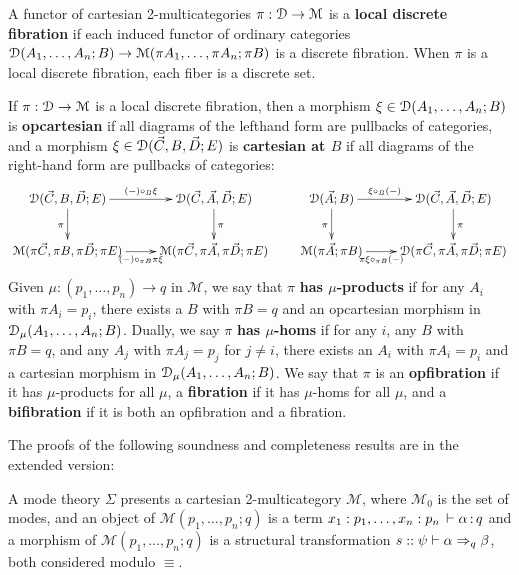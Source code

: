 \documentclass[a4paper,USenglish,numberwithinsect]{lipics-v2016}
\newcommand\deq{\ensuremath{\equiv}}
\renewcommand{\oftp}[3]{\ensuremath{#1 \, \vdash #2 \, \dcd{:} \, #3}}
\def\M{\mathcal{M}}
\begin{document}
\begin{definition}
  A functor of cartesian 2-multicategories $\pi:\cD\to\M$ is a
  \textbf{local discrete fibration} if each induced functor of ordinary
  categories $\cD(A_1,\dots,A_n;B)\to\M(\pi A_1,\dots,\pi A_n;\pi B)$ is
  a discrete fibration.  When $\pi$ is a local discrete fibration, each
  fiber is a discrete set.
\end{definition}

\begin{definition}
  If $\pi:\cD\to\M$ is a local discrete fibration, then a morphism
  $\xi\in\mathcal{D}(A_1,\dots,A_n;B)$ is \textbf{opcartesian} if all diagrams
  of the lefthand form are pullbacks of categories, and a morphism
  $\xi\in\mathcal{D}(\vec C,B,\vec D;E)$ is \textbf{cartesian at $B$} if all
  diagrams of the right-hand form are pullbacks of categories: 
  \[ \xymatrix{
    \cD(\vec C,B,\vec D;E) \ar[r]^-{(-)\circ_B \xi} \ar[d]_\pi &
    \cD(\vec C,\vec A,\vec D;E) \ar[d]^\pi \\
    \M(\pi\vec C,\pi B, \pi\vec D; \pi E) \ar[r]_-{(-)\circ_{\pi B} \pi\xi} &
    \M(\pi\vec C,\pi\vec A,\pi\vec D;\pi E)
  }
  \qquad
  \xymatrix{
    \cD(\vec A;B) \ar[r]^-{\xi\circ_B (-)} \ar[d]_\pi &
    \cD(\vec C,\vec A,\vec D;E) \ar[d]^\pi \\
    \M(\pi\vec A;\pi B) \ar[r]_-{\pi\xi\circ_{\pi B} (-)} &
    \cD(\pi\vec C,\pi\vec A,\pi\vec D;\pi E)}
  \]
  Given $\mu:(p_1,\dots,p_n) \to q$ in $\M$, we say that $\pi$ \textbf{has $\mu$-products} if for any $A_i$ with $\pi A_i = p_i$, there exists a $B$ with $\pi B = q$ and an opcartesian morphism in $\mathcal{D}_\mu(A_1,\dots,A_n;B)$.
  Dually, we say $\pi$ \textbf{has $\mu$-homs} if for any $i$, any $B$ with $\pi B = q$, and any $A_j$ with $\pi A_j = p_j$ for $j\neq i$, there exists an $A_i$ with $\pi A_i = p_i$ and a cartesian morphism in $\mathcal{D}_\mu(A_1,\dots,A_n;B)$.
  We say that $\pi$ is an \textbf{opfibration} if it has $\mu$-products for all $\mu$, a \textbf{fibration} if it has $\mu$-homs for all $\mu$, and a \textbf{bifibration} if it is both an opfibration and a fibration.
\end{definition}

The proofs of the following soundness and completeness results are in
the extended version:

\begin{theorem}
\label{thm:completeness-mode-theory}
A mode theory $\Sigma$ presents a cartesian 2-multicategory $\M$, where
$\M_0$ is the set of modes, and an object of $\M(p_1,\ldots,p_n;q)$ is a
term $\oftp{x_1:p_1,\ldots,x_n:p_n}{\alpha}{q}$ and a morphism of $\M(p_1,\ldots,p_n;q)$ is a structural transformation
$s :: \psi \vdash \alpha \Rightarrow_{q} \beta$, both considered modulo $\deq$.
\end{theorem}
\end{document}
